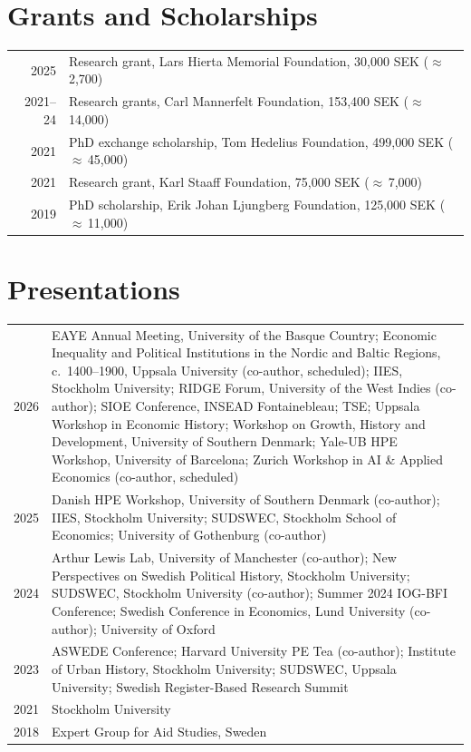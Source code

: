 \documentclass[a4paper]{article}
\makeatletter
\newenvironment{cvtabular}
  {\begin{tabular}{@{}D@{\hspace{6pt}}Y@{}}}
  {\end{tabular}}
\newenvironment{cvlongtable}
  {\begin{longtable}{@{}D@{\hspace{6pt}}Y@{}}}
  {\end{longtable}}
\makeatother
\begin{document}
\section*{Grants and Scholarships}

\begin{cvtabular}
2025 & Research grant, Lars Hierta Memorial Foundation, 30,000 SEK ($\approx$\,\texteuro{}2,700) \\
2021--24 & Research grants, Carl Mannerfelt Foundation, 153,400 SEK ($\approx$\,\texteuro{}14,000) \\
2021 & PhD exchange scholarship, Tom Hedelius Foundation, 499,000 SEK ($\approx$\,\texteuro{}45,000) \\
2021 & Research grant, Karl Staaff Foundation, 75,000 SEK ($\approx$\,\texteuro{}7,000) \\
2019 & PhD scholarship, Erik Johan Ljungberg Foundation, 125,000 SEK ($\approx$\,\texteuro{}11,000)
\end{cvtabular}

\enlargethispage{\baselineskip}
\section*{Presentations}

\begin{cvlongtable}
2026 & EAYE Annual Meeting, University of the Basque Country; Economic Inequality and Political Institutions in the Nordic and Baltic Regions, c.~1400--1900, Uppsala University (co-author, scheduled); IIES, Stockholm University; RIDGE Forum, University of the West Indies (co-author); SIOE Conference, INSEAD Fontainebleau; TSE; Uppsala Workshop in Economic History; Workshop on Growth, History and Development, University of Southern Denmark; Yale-UB HPE Workshop, University of Barcelona; Zurich Workshop in AI \& Applied Economics (co-author, scheduled) \\
2025 & Danish HPE Workshop, University of Southern Denmark (co-author); IIES, Stockholm University; SUDSWEC, Stockholm School of Economics; University of Gothenburg (co-author) \\
2024 & Arthur Lewis Lab, University of Manchester (co-author); New Perspectives on Swedish Political History, Stockholm University; SUDSWEC, Stockholm University (co-author); Summer 2024 IOG-BFI Conference; Swedish Conference in Economics, Lund University (co-author); University of Oxford \\
2023 & ASWEDE Conference; Harvard University PE Tea (co-author); Institute of Urban History, Stockholm University; SUDSWEC, Uppsala University; Swedish Register-Based Research Summit \\
2021 & Stockholm University \\
2018 & Expert Group for Aid Studies, Sweden
\end{cvlongtable}
\end{document}
